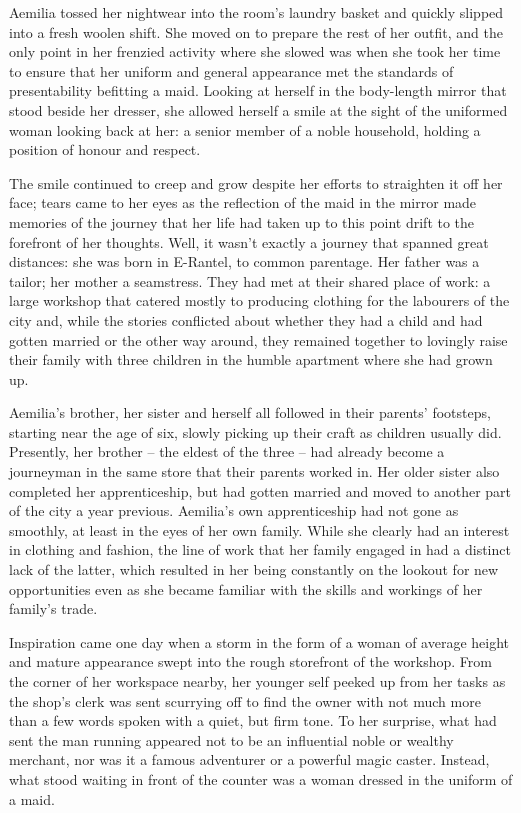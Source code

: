  

Aemilia tossed her nightwear into the room’s laundry basket and quickly slipped into a fresh woolen shift. She moved on to prepare the rest of her outfit, and the only point in her frenzied activity where she slowed was when she took her time to ensure that her uniform and general appearance met the standards of presentability befitting a maid. Looking at herself in the body-length mirror that stood beside her dresser, she allowed herself a smile at the sight of the uniformed woman looking back at her: a senior member of a noble household, holding a position of honour and respect.

 

The smile continued to creep and grow despite her efforts to straighten it off her face; tears came to her eyes as the reflection of the maid in the mirror made memories of the journey that her life had taken up to this point drift to the forefront of her thoughts. Well, it wasn’t exactly a journey that spanned great distances: she was born in E-Rantel, to common parentage. Her father was a tailor; her mother a seamstress. They had met at their shared place of work: a large workshop that catered mostly to producing clothing for the labourers of the city and, while the stories conflicted about whether they had a child and had gotten married or the other way around, they remained together to lovingly raise their family with three children in the humble apartment where she had grown up.

 

Aemilia’s brother, her sister and herself all followed in their parents’ footsteps, starting near the age of six, slowly picking up their craft as children usually did. Presently, her brother – the eldest of the three – had already become a journeyman in the same store that their parents worked in. Her older sister also completed her apprenticeship, but had gotten married and moved to another part of the city a year previous. Aemilia’s own apprenticeship had not gone as smoothly, at least in the eyes of her own family. While she clearly had an interest in clothing and fashion, the line of work that her family engaged in had a distinct lack of the latter, which resulted in her being constantly on the lookout for new opportunities even as she became familiar with the skills and workings of her family’s trade.

 

Inspiration came one day when a storm in the form of a woman of average height and mature appearance swept into the rough storefront of the workshop. From the corner of her workspace nearby, her younger self peeked up from her tasks as the shop’s clerk was sent scurrying off to find the owner with not much more than a few words spoken with a quiet, but firm tone. To her surprise, what had sent the man running appeared not to be an influential noble or wealthy merchant, nor was it a famous adventurer or a powerful magic caster. Instead, what stood waiting in front of the counter was a woman dressed in the uniform of a maid.

